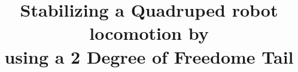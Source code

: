 %
\title{\LARGE \bf
Stabilizing a Quadruped robot locomotion by\\ using a 2 Degree of Freedome Tail}
